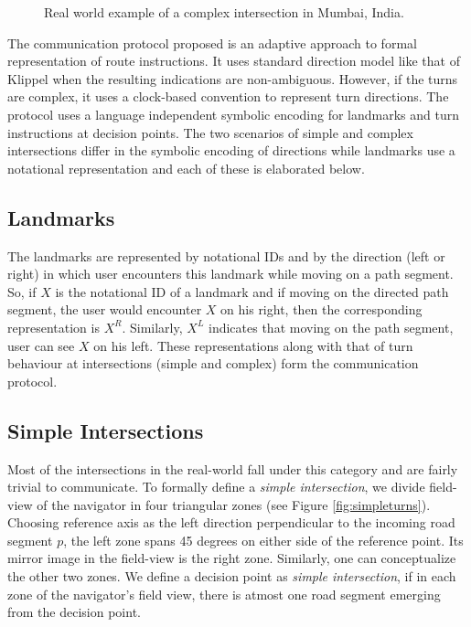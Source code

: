 \documentclass{iitkthesis}
\begin{document}
 \begin{figure}
\centering
\caption{Real world example of a complex intersection in Mumbai, India.}
\label{fig:complex_real}
 \end{figure}


The communication protocol proposed is an adaptive approach to formal representation of route instructions. It uses standard direction model like that of Klippel \cite{klippel} when the resulting indications are non-ambiguous. However, if the turns are complex, it uses a clock-based convention to represent turn directions. The protocol uses a language independent symbolic encoding for landmarks and turn instructions at decision points. The two scenarios of simple and complex intersections differ in the symbolic encoding of directions while landmarks use a notational representation and each of these is elaborated below. 

\subsection{Landmarks}
The landmarks are represented by notational IDs and by the direction (left or right) in which user encounters this landmark while moving on a path segment. So, if $X$ is the notational ID of a landmark and if moving on the directed path segment, the user would encounter $X$ on his right, then the corresponding representation is $X^R$. Similarly, $X^L$ indicates that moving on the path segment, user can see $X$ on his left. These representations along with that of turn behaviour at intersections (simple and complex) form the communication protocol. 

\subsection{Simple Intersections}
Most of the intersections in the real-world fall under this category and are fairly trivial to communicate. To formally define a \textit{simple intersection}, we divide field-view of the navigator in four triangular zones (see Figure \ref{fig:simpleturns}). Choosing reference axis as the left direction perpendicular to the incoming road segment $p$, the left zone spans 45 degrees on either side of the reference point. Its mirror image in the field-view is the right zone. Similarly, one can conceptualize the other two zones. We define a decision point as \textit{simple intersection}, if in each zone of the navigator's field view, there is atmost one road segment emerging from the decision point. 
\end{document}
